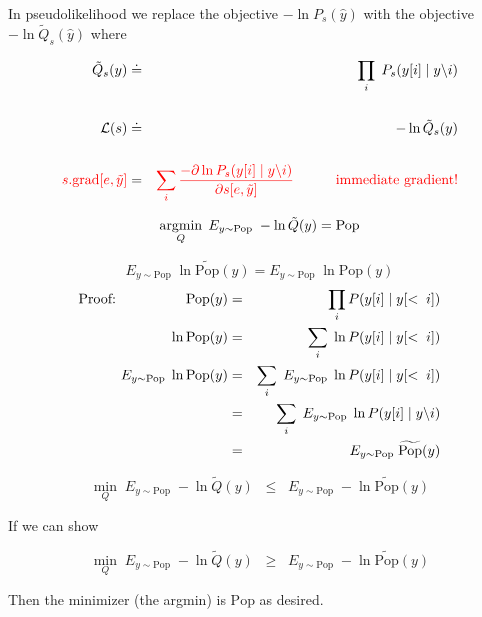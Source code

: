 {

In pseudolikelihood we replace the objective $- \ln P_s(\hat{y})$ with the objective $- \ln \tilde{Q}_s(\hat{y})$ where

\vfill
\begin{eqnarray*}
  \tilde{Q}_s(y) & \doteq & \prod_i \;P_s(y[i] \;|\;y\backslash i) \\
  \\
  {\cal L}(s) & \doteq & - \ln \tilde{Q}_s(y) \\
  \\
  {\color{red} s.\mathrm{grad}[e,\tilde{y}]} & = & {\color{red} \sum_i \frac{- \partial \ln P_s(y[i] \;|\;y\backslash i)}{\partial s[e,\tilde{y}]}
  \hspace{3em} \mbox{immediate gradient!}}
\end{eqnarray*}



$$\operatorname*{argmin}_Q \; E_{y \sim \mathrm{Pop}} \;-\ln \tilde{Q}(y) = \mathrm{Pop}$$

\vfill


{\color{red} $$E_{y \sim \mathrm{Pop}}\;\ln \widetilde{\mathrm{Pop}}(y) = E_{y \sim \mathrm{Pop}}\;\ln \mathrm{Pop}(y)$$}
{\huge
\begin{eqnarray*}
\mbox{Proof:}\hspace{5em}\mathrm{Pop}(y) & = & \prod_i P(y[i]\;|\; y[<\;i]) \\
\ln \mathrm{Pop}(y) & = & \sum_i \; \ln P(y[i]\;|\; y[<\;i]) \\
E_{y \sim \mathrm{Pop}}\;\ln \mathrm{Pop}(y) & = & \sum_i \;E_{y \sim \mathrm{Pop}} \; \ln P(y[i]\;|\; y[<\;i]) \\
& = & \sum_i \;E_{y \sim \mathrm{Pop}} \;\ln P(y[i]\;|\; y\backslash i) \\
& = & E_{y\sim \mathrm{Pop}}\;\widetilde{\mathrm{Pop}}(y)
\end{eqnarray*}
}

$$\min_{Q} \;E_{y \sim \mathrm{Pop}}\;-\ln \tilde{Q}(y) \;\;\leq \;\; E_{y \sim \mathrm{Pop}}\;-\ln \widetilde{\mathrm{Pop}}(y)$$

\vfill
If we can show

$$\min_{Q} \;E_{y \sim \mathrm{Pop}}\;-\ln \tilde{Q}(y) \;\;\geq \;\; E_{y \sim \mathrm{Pop}}\;-\ln \widetilde{\mathrm{Pop}}(y)$$

Then the minimizer (the argmin) is $\mathrm{Pop}$ as desired.


}
